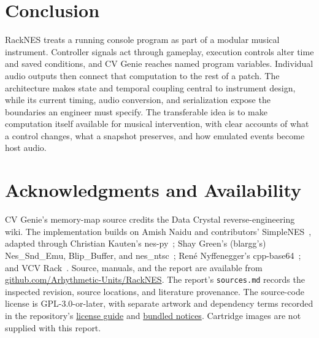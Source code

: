 \documentclass[10pt,letterpaper,twocolumn]{article}
\newcommand{\code}[1]{\texttt{#1}}
\begin{document}
\section{Conclusion}
RackNES treats a running console program as part of a modular musical
instrument. Controller signals act through gameplay, execution controls alter
time and saved conditions, and CV Genie reaches named program variables.
Individual audio outputs then connect that computation to the rest of a patch.
The architecture makes state and temporal coupling central to instrument
design, while its current timing, audio conversion, and serialization expose
the boundaries an engineer must specify. The transferable idea is to make
computation itself available for musical intervention, with clear accounts of
what a control changes, what a snapshot preserves, and how emulated events
become host audio.

\section*{Acknowledgments and Availability}
CV Genie's memory-map source credits the Data Crystal reverse-engineering wiki.
The implementation builds on
Amish Naidu and contributors' SimpleNES~\cite{simplenes}, adapted through
Christian Kauten's nes-py~\cite{nespy}; Shay Green's (blargg's) Nes\_Snd\_Emu,
Blip\_Buffer, and nes\_ntsc~\cite{green,ntsc}; Ren\'e Nyffenegger's
cpp-base64~\cite{base64}; and VCV Rack~\cite{rack}. Source, manuals,
and the report are available from
\href{https://github.com/Arhythmetic-Units/RackNES}{github.com/Arhythmetic-Units/RackNES}.
The report's \code{sources.md} records the inspected revision, source locations,
and literature provenance. The source-code license is GPL-3.0-or-later, with
separate artwork and dependency terms recorded in the repository's
\href{https://github.com/Arhythmetic-Units/RackNES/blob/master/LICENSING.md}{license guide}
and \href{https://github.com/Arhythmetic-Units/RackNES/blob/master/docs/licenses/THIRD-PARTY.txt}{bundled notices}. Cartridge
images are not supplied with this report.
\end{document}

